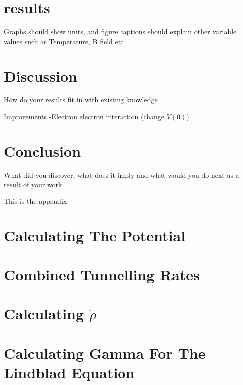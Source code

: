 \documentclass{article}
\begin{document}
\section{results}
Graphs should show units, and figure captions should explain other variable values such as Temperature, B
field etc

\section{Discussion}
How do your results fit in with existing knowledge

Improvements
-Electron electron interaction (change \(V(0)\))


\section{Conclusion}
What did you discover, what does it imply and what would you do next as a result of your work

\printbibliography{}

\begin{appendix}
    This is the appendix
    \section{Calculating The Potential}\label{app:interaction potential calculation}
    

    \section{Combined Tunnelling Rates}\label{app:combined tunnelling rates}
    

    \section{Calculating \(\dot{\rho}\)}
    

    \section{Calculating Gamma For The Lindblad Equation}
    


\end{appendix}
\end{document}

